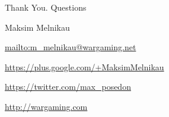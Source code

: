\documentclass[aspectratio=169]{beamer}
\begin{document}
{

\begin{frame}{Thank You. Questions}
    \begin{block}{Maksim Melnikau}
    \par \url{mailto:m\_melnikau@wargaming.net}
    \par \url{https://plus.google.com/+MaksimMelnikau}
    \par \url{https://twitter.com/max\_posedon}
    \par \url{http://wargaming.com}
    \end{block}
\end{frame}
}
\end{document}

